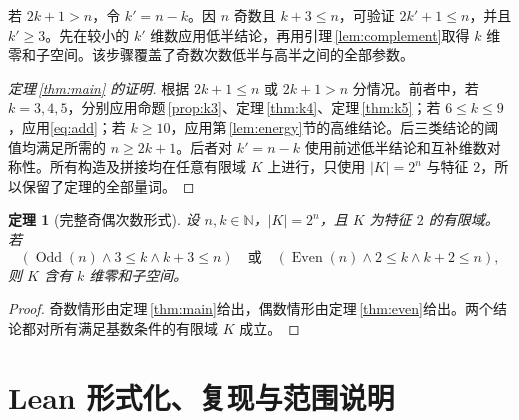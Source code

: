 \documentclass[UTF8,a4paper,11pt]{ctexart}
\numberwithin{equation}{section}
\newtheorem{theorem}{定理}[section]
\theoremstyle{definition}
\theoremstyle{remark}
\begin{document}
若 $2k+1>n$，令 $k'=n-k$。因 $n$ 奇数且 $k+3\le n$，可验证 $2k'+1\le n$，并且 $k'\ge3$。先在较小的 $k'$ 维数应用低半结论，再用引理\,\ref{lem:complement}取得 $k$ 维零和子空间。该步骤覆盖了奇数次数低半与高半之间的全部参数。

\begin{proof}[定理\,\ref{thm:main} 的证明]
根据 $2k+1\le n$ 或 $2k+1>n$ 分情况。前者中，若 $k=3,4,5$，分别应用命题\,\ref{prop:k3}、定理\,\ref{thm:k4}、定理\,\ref{thm:k5}；若 $6\le k\le9$，应用\eqref{eq:add}；若 $k\ge10$，应用第\,\ref{lem:energy}节的高维结论。后三类结论的阈值均满足所需的 $n\ge2k+1$。后者对 $k'=n-k$ 使用前述低半结论和互补维数对称性。所有构造及拼接均在任意有限域 $K$ 上进行，只使用 $|K|=2^n$ 与特征 $2$，所以保留了定理的全部量词。
\end{proof}

\begin{theorem}[完整奇偶次数形式]\label{thm:full}
设 $n,k\in\mathbb N$，$|K|=2^n$，且 $K$ 为特征 $2$ 的有限域。若
\[
 (\operatorname{Odd}(n)\land 3\le k\land k+3\le n)
 \quad\text{或}\quad
 (\operatorname{Even}(n)\land 2\le k\land k+2\le n),
\]
则 $K$ 含有 $k$ 维零和子空间。
\end{theorem}
\begin{proof}
奇数情形由定理\,\ref{thm:main}给出，偶数情形由定理\,\ref{thm:even}给出。两个结论都对所有满足基数条件的有限域 $K$ 成立。
\end{proof}

\section{Lean 形式化、复现与范围说明}\label{sec:formal}
\sloppy
\end{document}
